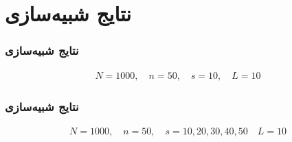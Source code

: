 \section{نتایج شبیه‌سازی\hfill}

\begin{frame}
\frametitle{نتایج شبیه‌سازی}
\begin{align*}
N= 1000, \quad n= 50, \quad s= 10, \quad L=10
\end{align*}
\begin{figure}
	\centering
	
\end{figure}
\end{frame}
\begin{frame}
\frametitle{نتایج شبیه‌سازی}
\begin{align*}
N= 1000, \quad n= 50, \quad s= 10,20,30,40,50 \quad L=10
\end{align*}
\begin{figure}
	\centering
	
\end{figure}
\end{frame}
